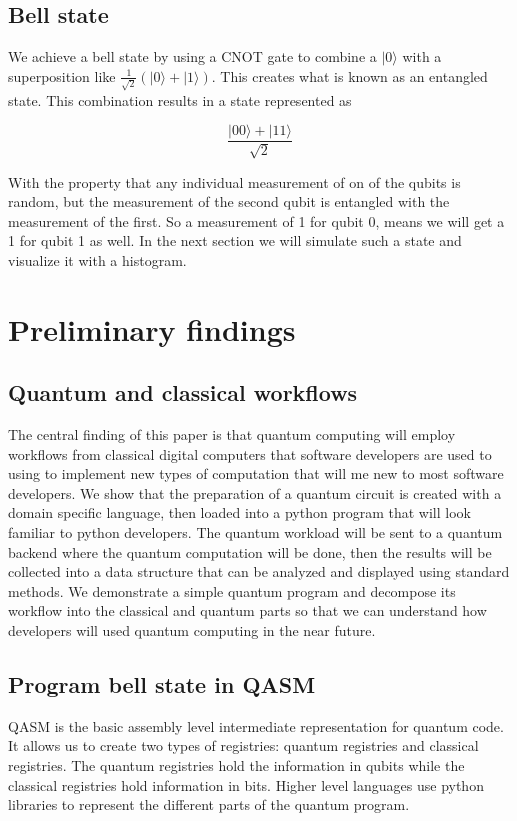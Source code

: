 \documentclass{article}
\newcommand{\ket}[1]{{\lvert #1 \rangle}}
\begin{document}
\subsection{Bell state}

We achieve a bell state by using a CNOT gate to combine a $\ket{0}$ with a superposition like 
$\frac{1}{\sqrt{2}}(\ket{0}+\ket{1})$. This creates what is known as an entangled state. This combination results in a state represented as 

$$
\frac{\ket{00}+\ket{11}}{\sqrt{2}}
$$

With the property that any individual measurement of on of the qubits is random, but the measurement of the second qubit is entangled with the measurement of the first. So a measurement of 1 for qubit 0, means we will get a 1 for qubit 1 as well. In the next section we will simulate such a state and visualize it with a histogram.




\section{Preliminary findings}

\subsection{Quantum and classical workflows}

The central finding of this paper is that quantum computing will employ workflows from classical digital computers that software developers are used to using to implement new types of computation that will me new to most software developers. We show that the preparation of a quantum circuit is created with a domain specific language, then loaded into a python program that will look familiar to python developers. The quantum workload will be sent to a quantum backend where the quantum computation will be done, then the results will be collected into a data structure that can be analyzed and displayed using standard methods. We demonstrate a simple quantum program and decompose its workflow into the classical and quantum parts so that we can understand how developers will used quantum computing in the near future.

\subsection{Program bell state in QASM}

QASM is the basic assembly level intermediate representation for quantum code. It allows us to create two types of registries: quantum registries and classical registries. The quantum registries hold the information in qubits while the classical registries hold information in bits. Higher level languages use python libraries to represent the different parts of the quantum program.
\end{document}
